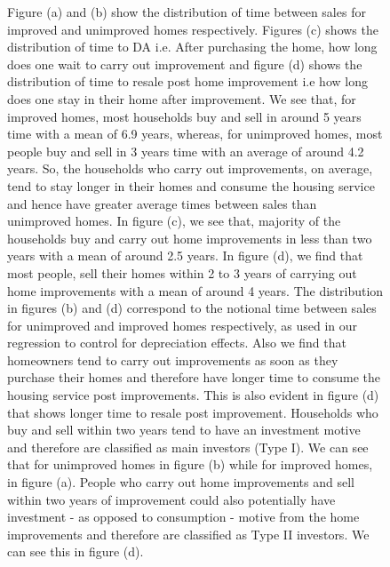 \documentclass[AEJ,reqno, draftmode]{AEA} %
\begin{document}
\begin{figure}[!tp]
 \caption*{\small Figure (a) and (b) show the distribution of time between sales for improved and unimproved homes respectively. Figures (c) shows the distribution of time to DA i.e. After purchasing the home, how long does one wait to carry out improvement and figure (d) shows the distribution of time to resale post home improvement i.e how long does one stay in their home after improvement. We see that, for improved homes, most households buy and sell in around 5 years time with a mean of 6.9 years, whereas, for unimproved homes, most people buy and sell in 3 years time with an average of around 4.2 years. So, the households who carry out improvements, on average, tend to stay longer in their homes and consume the housing service and hence have greater average times between sales than unimproved homes.  In figure (c), we see that, majority of the households buy and carry out home improvements in less than two years with a mean of around 2.5 years. In figure (d), we find that most people, sell their homes within 2 to 3 years of carrying out home improvements with a mean of around 4 years. The distribution in figures (b) and (d) correspond to the notional time between sales for unimproved and improved homes respectively, as used in our regression to control for depreciation effects.  Also we find that homeowners tend to carry out improvements as soon as they purchase their homes and therefore have longer time to consume the housing service post improvements. This is also evident in figure (d) that shows longer time to resale post improvement. Households who buy and sell within two years tend to have an investment motive and therefore are classified as main investors (Type I). We can see that for unimproved homes in figure (b) while for improved homes, in figure (a). People who carry out home improvements and sell within two years of improvement could also potentially have investment - as opposed to consumption - motive from the home improvements and therefore are classified as Type II investors. We can see this in figure (d).}
\end{figure}






\clearpage


\end{document}
